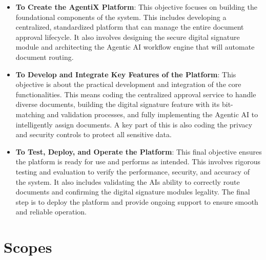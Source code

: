 \documentclass[12pt,oneside,openright,a4paper]{cpe-english-project}
\begin{document}
\begin{itemize}
\item
  \textbf{To Create the AgentiX Platform}: This objective focuses on
  building the foundational components of the system. This includes
  developing a centralized, standardized platform that can manage the
  entire document approval lifecycle. It also involves designing the
  secure digital signature module and architecting the Agentic AI
  workflow engine that will automate document routing.
\item
  \textbf{To Develop and Integrate Key Features of the Platform}: This
  objective is about the practical development and integration of the
  core functionalities. This means coding the centralized approval
  service to handle diverse documents, building the digital signature
  feature with its bit-matching and validation processes, and fully
  implementing the Agentic AI to intelligently assign documents. A key
  part of this is also coding the privacy and security controls to
  protect all sensitive data.
\item
  \textbf{To Test, Deploy, and Operate the Platform}: This final
  objective ensures the platform is ready for use and performs as
  intended. This involves rigorous testing and evaluation to verify the
  performance, security, and accuracy of the system. It also includes
  validating the AI\textquotesingle s ability to correctly route
  documents and confirming the digital signature
  module\textquotesingle s legality. The final step is to deploy the
  platform and provide ongoing support to ensure smooth and reliable
  operation.
\end{itemize}

\section{Scopes}
\end{document}
